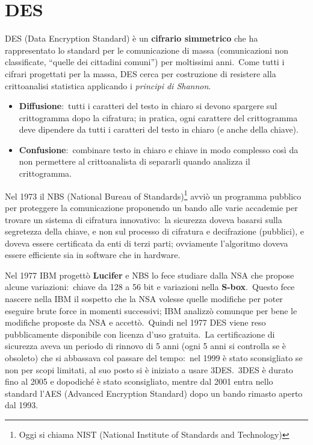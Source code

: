 \chapter{DES}

DES (Data Encryption Standard) è un \textbf{cifrario simmetrico} che ha rappresentato lo standard per le comunicazione di massa (comunicazioni non classificate, ``quelle dei cittadini comuni'') per moltissimi anni.\
Come tutti i cifrari progettati per la massa, DES cerca per costruzione di resistere alla crittoanalisi statistica applicando i \textit{principi di Shannon}.

\begin{itemize}
    \item \textbf{Diffusione}:\ tutti i caratteri del testo in chiaro si devono spargere sul crittogramma dopo la cifratura; in pratica, ogni carattere del crittogramma deve dipendere da tutti i caratteri del testo in chiaro (e anche della chiave).\
    \item \textbf{Confusione}:\ combinare testo in chiaro e chiave in modo complesso così da non permettere al crittoanalista di separarli quando analizza il crittogramma.\
\end{itemize}

\noindent Nel 1973 il NBS (National Bureau of Standards)\footnote{Oggi si chiama NIST (National Institute of Standards and Technology)} avviò un programma pubblico per proteggere la comunicazione proponendo un bando alle varie accademie per trovare un sistema di cifratura innovativo:\ la sicurezza  doveva basarsi sulla segretezza della chiave, e non sul processo di cifratura e decifrazione (pubblici), e doveva essere certificata da enti di terzi parti; ovviamente l'algoritmo doveva essere efficiente sia in software che in hardware.\

Nel 1977 IBM progettò \textbf{Lucifer} e NBS lo fece studiare dalla NSA che propose alcune variazioni:\ chiave da 128 a 56 bit e variazioni nella \textbf{S-box}.\
Questo fece nascere nella IBM il sospetto che la NSA volesse quelle modifiche per poter eseguire brute force in momenti successivi; IBM analizzò comunque per bene le modifiche proposte da NSA e accettò.\
Quindi nel 1977 DES viene reso pubblicamente disponibile con licenza d'uso gratuita.\
La certificazione di sicurezza aveva un periodo di rinnovo di 5 anni (ogni 5 anni si controlla se è obsoleto) che si abbassava col passare del tempo:\ nel 1999 è stato sconsigliato se non per scopi limitati, al suo posto si è iniziato a usare 3DES.\
3DES è durato fino al 2005 e dopodiché è stato sconsigliato, mentre dal 2001 entra nello standard l'AES (Advanced Encryption Standard) dopo un bando rimasto aperto dal 1993.

